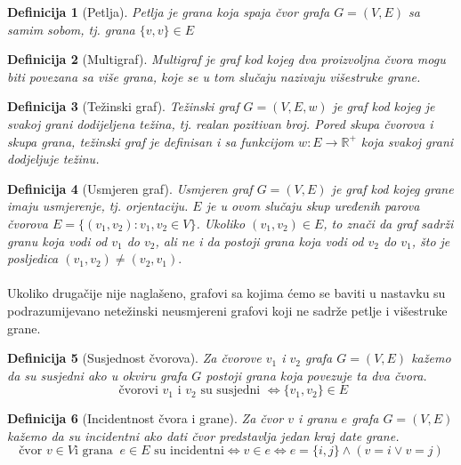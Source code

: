 \documentclass[11pt]{article}
\newtheorem{definition}{Definicija}
\begin{document}
		\begin{definition}[Petlja]
		Petlja je grana koja spaja čvor grafa $G=(V,E)$ sa samim sobom, tj. grana $\{v,v\} \in E$
		\end{definition}
	
		\begin{definition}[Multigraf]
		Multigraf je graf kod kojeg dva proizvoljna čvora mogu biti povezana sa više grana, koje se u tom slučaju nazivaju višestruke grane.
		\end{definition}
	
		\begin{definition}[Težinski graf]
		Težinski graf $G =(V,E,w)$ je graf kod kojeg je svakoj grani dodijeljena težina, tj. realan pozitivan broj. Pored skupa čvorova i skupa grana, težinski graf je definisan i sa funkcijom $w: E \to \mathbb{R}^+$ koja svakoj grani dodjeljuje težinu.
		\end{definition}
	
		\begin{definition}[Usmjeren graf]
		Usmjeren graf $G =(V,E)$ je graf kod kojeg grane imaju usmjerenje, tj. orjentaciju. $E$ je u ovom slučaju skup uređenih parova čvorova $E = \{ (v_1,v_2) : v_1, v_2 \in V\}$. 
		Ukoliko $(v_1,v_2) \in E$, to znači da graf sadrži granu koja vodi od $v_1$ do $v_2$, ali ne i da postoji grana koja vodi od $v_2$ do $v_1$, što je posljedica $(v_1,v_2) \neq (v_2,v_1).$
		\end{definition}
	
		\paragraph{}
		Ukoliko drugačije nije naglašeno, grafovi sa kojima ćemo se baviti u nastavku su podrazumijevano netežinski neusmjereni grafovi koji ne sadrže petlje i višestruke grane.
	
		\begin{definition}[Susjednost čvorova]
		Za čvorove $v_1$ i $v_2$ grafa $G = (V, E)$ kažemo da su susjedni ako u okviru grafa $G$ postoji grana koja povezuje ta dva čvora. 
		\[\text{ čvorovi } v_1 \text{ i } v_2 \text{ su susjedni } \Leftrightarrow \{v_1, v_2\} \in E \]
		\end{definition}
		
		\begin{definition}[Incidentnost čvora i grane]
		Za čvor $v$ i granu $e$ grafa $G = (V, E)$ kažemo da su incidentni ako dati čvor predstavlja jedan kraj date grane.
		\[ \text{čvor } v \in V \text{i grana }\ e \in E \text{ su incidentni} \Leftrightarrow v \in e \Leftrightarrow e = \{i,j\} \land ( v = i  \lor  v = j) \] 
		\end{definition}
	
\end{document}
